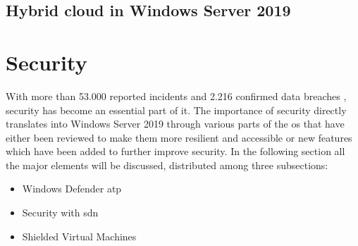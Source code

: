 \subsection{Hybrid cloud in Windows Server 2019}

\section{Security}
With more than 53.000 reported incidents and 2.216 confirmed data breaches \autocite{Verizon2018}, security has become an essential part of \acrshort{it}. The importance of security directly translates into Windows Server 2019 through various parts of the \acrshort{os} that have either been reviewed to make them more resilient and accessible or new features which have been added to further improve security. In the following section all the major elements will be discussed, distributed among three subsections:
\begin{itemize}
	\item Windows Defender \acrfull{atp}
	\item Security with \acrfull{sdn}
	\item Shielded Virtual Machines
\end{itemize}

